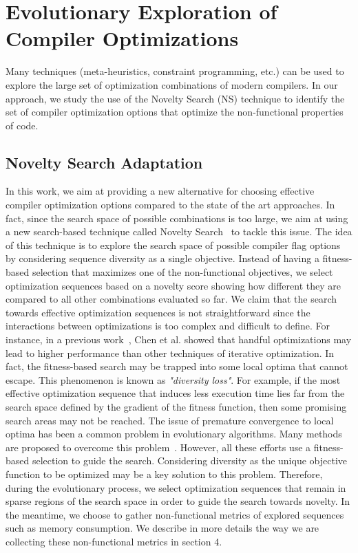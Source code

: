 \section{Evolutionary Exploration of Compiler Optimizations }


Many techniques (meta-heuristics, constraint programming, etc.) can be used to explore the large set of optimization combinations of modern compilers. 
In our approach, we study the use of the Novelty Search (NS) technique to identify the set of compiler optimization options that optimize the non-functional properties of code.

\subsection{Novelty Search Adaptation}

In this work, we aim at providing a new alternative for choosing effective compiler optimization options compared to the state of the art approaches. 
In fact, since the search space of possible combinations is too large, we aim at using a new search-based technique called Novelty Search~\cite{lehman2008exploiting} to tackle this issue. 
The idea of this technique is to explore the search space of possible compiler flag options by considering sequence diversity as a single objective. 
Instead of having a fitness-based selection that maximizes one of the non-functional objectives, we select optimization sequences based on a novelty score showing how different they are compared to all other combinations evaluated so far. 
We claim that the search towards effective optimization sequences is not straightforward since the interactions between optimizations is too complex and difficult to define. 
For instance, in a previous work~\cite{chen2012deconstructing}, Chen et al. showed that handful optimizations may lead to higher performance than other techniques of iterative optimization. 
In fact, the fitness-based search may be trapped into some local optima that cannot escape. 
This phenomenon is known as \textit{"diversity loss"}. For example, if the most effective optimization sequence that induces less execution time lies far from the search space defined by the gradient of the fitness function, then some promising search areas may not be reached. 
The issue of premature convergence to local optima has been a common problem in evolutionary algorithms. 
Many methods are proposed to overcome this problem~\cite{banzhaf1996effect}. 
However, all these efforts use a fitness-based selection to guide the search. Considering diversity as the unique objective function to be optimized may be a key solution to this problem.
Therefore, during the evolutionary process, we select optimization sequences that remain in sparse regions of the search space in order to guide the search towards novelty. 
In the meantime, we choose to gather non-functional metrics of explored sequences such as memory consumption. 
We describe in more details the way we are collecting these non-functional metrics in section 4.

